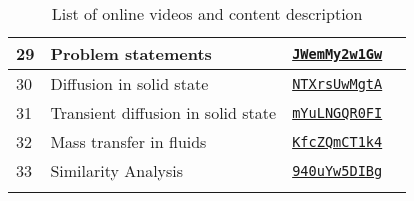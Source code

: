 \begin{longtable}{|p{1cm}|p{8cm}|p{3cm}|p{2cm}|}
	\hline
	29 & Problem statements & \href{https://www.youtube.com/watch?v=JWemMy2w1Gw}{\tt JWemMy2w1Gw} & \\
	\hline
	30 & Diffusion in solid state & \href{https://www.youtube.com/watch?v=NTXrsUwMgtA}{\tt NTXrsUwMgtA} & \\
	\hline
	31 & Transient diffusion in solid state & \href{https://www.youtube.com/watch?v=mYuLNGQR0FI}{\tt mYuLNGQR0FI} & \\
	\hline
	32 & Mass transfer in fluids & \href{https://www.youtube.com/watch?v=KfcZQmCT1k4}{\tt KfcZQmCT1k4} & \\
	\hline
	33 & Similarity Analysis & \href{https://www.youtube.com/watch?v=940uYw5DIBg}{\tt 940uYw5DIBg} & \\
	\hline
\caption{List of online videos and content description}
\label{tbl:links}
\end{longtable}

